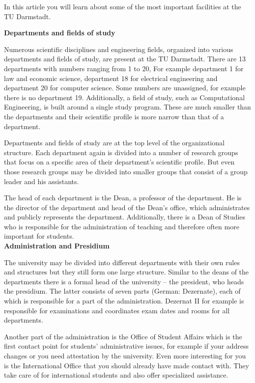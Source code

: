 {In this article you will learn about some of the most important facilities at the TU Darmstadt.
}{
\textbf{Departments and fields of study}

Numerous scientific disciplines and engineering fields, organized into various departments and fields of study, are present at the TU Darmstadt.
There are 13 departments with numbers ranging from 1 to 20, For example department 1 for law and economic science, department 18 for electrical engineering and department 20 for computer science. Some numbers are unassigned, for example there is no department 19. Additionally, a field of study, such as Computational Engineering, is built around a single study program. These are much smaller than the departments and their scientific profile is more narrow than that of a department.

Departments and fields of study are at the top level of the organizational structure. Each department again is divided into a number of research groups that focus on a specific area of their department's scientific profile. But even those research groups may be divided into smaller groups that consist of a group leader and his assistants.

The head of each department is the Dean, a professor of the department. He is the director of the department and head of the Dean's office, which administrates and publicly represents the department.
Additionally, there is a Dean of Studies who is responsible for the administration of teaching and therefore often more important for students.\\

\textbf{Administration and Presidium}

The university may be divided into different departments with their own rules and structures but they still form one large structure. Similar to the deans of the departments there is a formal head of the university -- the president, who heads the presidium. The latter consists of seven parts (German: Dezernate), each of which is responsible for a part of the administration. Dezernat II for example is responsible for examinations and coordinates exam dates and rooms for all departments.

Another part of the administration is the Office of Student Affairs which is the first contact point for students' administrative issues, for example if your address changes or you need attestation by the university. Even more interesting for you is the International Office that you should already have made contact with. They take care of for international students and also offer specialized assistance.\\

}
